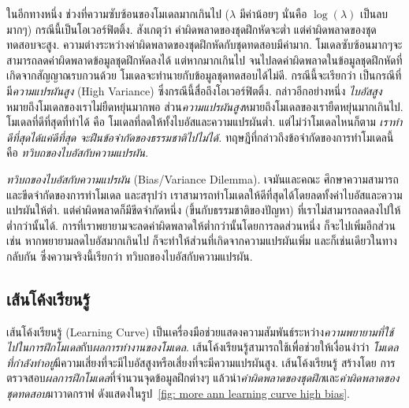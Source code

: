 ในอีกทางหนึ่ง ช่วงที่ความซับซ้อนของโมเดลมากเกินไป ($\lambda$ มีค่าน้อยๆ นั่นคือ $\log(\lambda)$ เป็นลบมากๆ) กรณีนี้เป็นโอเวอร์ฟิตติ้ง.
สังเกตุว่า ค่าผิดพลาดของชุดฝึกหัดจะต่ำ แต่ค่าผิดพลาดของชุดทดสอบจะสูง.
ความต่างระหว่างค่าผิดพลาดของชุดฝึกหัดกับชุดทดสอบมีค่ามาก.
โมเดลซับซ้อนมากๆจะสามารถลดค่าผิดพลาดข้อมูลชุดฝึกหัดลงได้
แต่หากมากเกินไป จนไปลดค่าผิดพลาดในข้อมูลชุดฝึกหัดที่เกิดจากสัญญาณรบกวนด้วย โมเดลจะทำนายกับข้อมูลชุดทดสอบได้ไม่ดี.
กรณีนี้จะเรียกว่า เป็นกรณีที่มี\textit{ความแปรผันสูง} (High Variance) 
ซึ่งกรณีนี้สื่อถึงโอเวอร์ฟิตติ้ง.
%
กล่าวอีกอย่างหนึ่ง \textit{ไบอัสสูง}หมายถึงโมเดลของเราไม่ยืดหยุ่นมากพอ 
ส่วน\textit{ความแปรผันสูง}หมายถึงโมเดลของเรายืดหยุ่นมากเกินไป.
%
โมเดลที่ดีที่สุดที่ทำได้ คือ โมเดลที่ลดให้ทั้งไบอัสและความแปรผันต่ำ.
แต่ไม่ว่าโมเดลไหนก็ตาม \emph{เราทำดีที่สุดได้แค่ดีที่สุด จะฝืนข้อจำกัดของธรรมชาติไปไม่ได้.}
ทฤษฎีที่กล่าวถึงข้อจำกัดของการทำโมเดลนี้คือ \textit{ทวิบถของไบอัสกับความแปรผัน}\cite{GemanEtAl1992a}.
%

{\small
\begin{shaded}
\textit{ทวิบถของไบอัสกับความแปรผัน} (Bias/Variance Dilemma).
เจมันและคณะ\cite{GemanEtAl1992a} ศึกษาความสามารถและขีดจำกัดของการทำโมเดล  
และสรุปว่า เราสามารถทำโมเดลให้ดีที่สุดได้โดยลดทั้งค่าไบอัสและความแปรผันให้ต่ำ.
แต่ค่าผิดพลาดก็มีขีดจำกัดหนึ่ง (ขึ้นกับธรรมชาติของปัญหา) ที่เราไม่สามารถลดลงไปให้ต่ำกว่านั้นได้. การที่เราพยายามจะลดค่าผิดพลาดให้ต่ำกว่านั้นโดยการลดส่วนหนึ่ง ก็จะไปเพิ่มอีกส่วน 
เช่น หากพยายามลดไบอัสมากเกินไป ก็จะทำให้ส่วนที่เกิดจากความแปรผันเพิ่ม 
และก็เช่นเดียวในทางกลับกัน ซึ่งความจริงนี้เรียกว่า ทวิบถของไบอัสกับความแปรผัน.
\end{shaded}
}%

\subsection{เส้นโค้งเรียนรู้}
 
เส้นโค้งเรียนรู้ (Learning Curve) เป็นเครื่องมือช่วยแสดงความสัมพันธ์ระหว่าง\textit{ความพยายามที่ใช้ไปในการฝึกโมเดล}กับ\textit{ผลการทำงานของโมเดล}.
เส้นโค้งเรียนรู้สามารถใช้เพื่อช่วยให้เงื่อนงำว่า \textit{โมเดลที่กำลังทำอยู่}มีความเสี่ยงที่จะมีไบอัสสูงหรือเสี่ยงที่จะมีความแปรผันสูง.
เส้นโค้งเรียนรู้ สร้างโดย การตรวจสอบ\textit{ผลการฝึกโมเดล}ที่จำนวนจุดข้อมูลฝึกต่างๆ 
แล้วนำ\textit{ค่าผิดพลาดของชุดฝึก}และ\textit{ค่าผิดพลาดของชุดทดสอบ}มาวาดกราฟ ดังแสดงในรูป~\ref{fig: more ann learning curve high bias}.

